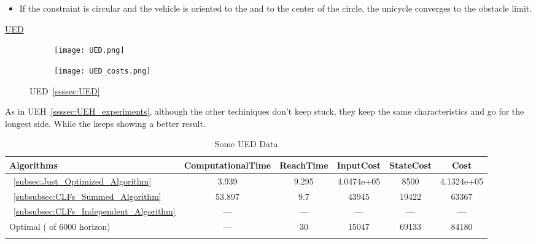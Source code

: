 \begin{tcolorbox}[colback=blue!5!white,colframe=blue!35!white,title=Notes:]
\begin{itemize}
    \item If the constraint is circular and the vehicle is oriented to the \txtref and to the center of the circle, the unicycle converges to the obstacle limit.
  \end{itemize}
\end{tcolorbox} 

\newpage %

\underline{UED}
\label{UED_experiments} %

 \begin{figure}[htbp]
  \begin{subfigure}{0.6\textwidth}
    \centering
    \texttt{[image: UED.png]}
  \label{fig:UED_CostEvol}
  \end{subfigure}
  \begin{subfigure}{0.59\textwidth}
    \centering
    \texttt{[image: UED\_costs.png]}
  \label{fig:UED_trajectory}
  \end{subfigure}
  \caption{UED~\ref{ssssec:UED}}
\label{fig:UEDTrajectory_and_CostEvol}
\end{figure}


As in UEH~\ref{ssssec:UEH_experiments}, although the other techiniques don't keep stuck, they keep the same characteristics and go for the longest side. While the  keeps showing a better result.


\bgroup
 \begin{xltabular}{\textwidth}{|l|ccccc|}
   \toprule
   Algorithms   & ComputationalTime  & ReachTime  & InputCost   & StateCost & Cost           \\
   \midrule
    ~\ref{subsec:Just_Optimized_Algorithm}           & 3.939  & 9.295  & 4.0474e+05 & 8500 & 4.1324e+05 \\
    ~\ref{subsubsec:CLFs_Summed_Algorithm}        & 53.897 & 9.7     & 43945 & 19422 & 63367 \\
    ~\ref{subsubsec:CLFs_Independent_Algorithm}   & ---   & ---      & ---  & ---  & ---  \\
    Optimal ( of 6000 horizon)                        & ---    & 30 & 15047  & 69133 & 84180 \\
    \midrule
    \caption{Some UED Data}
   \label{tab:Some_UED_Data}\\
   \end{xltabular}
 \egroup


